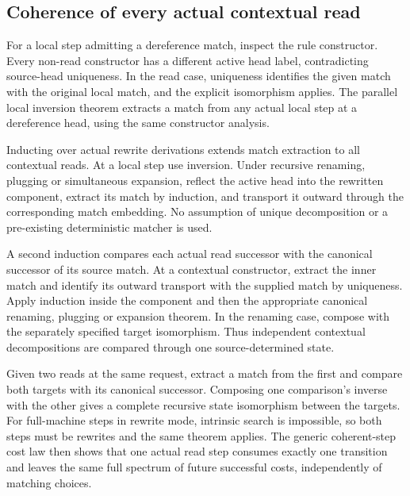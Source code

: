 

\subsection{Coherence of every actual contextual read}

For a local step admitting a dereference match, inspect the rule constructor.
Every non-read constructor has a different active head label, contradicting
source-head uniqueness. In the read case, uniqueness identifies the given
match with the original local match, and the explicit isomorphism applies.
The parallel local inversion theorem extracts a match from any actual local
step at a dereference head, using the same constructor analysis.



Inducting over actual rewrite derivations extends match extraction to all
contextual reads. At a local step use inversion. Under recursive renaming,
plugging or simultaneous expansion, reflect the active head into the rewritten
component, extract its match by induction, and transport it outward through
the corresponding match embedding. No assumption of unique decomposition
or a pre-existing deterministic matcher is used.


A second induction compares each actual read successor with the canonical
successor of its source match. At a contextual constructor, extract the inner
match and identify its outward transport with the supplied match by uniqueness.
Apply induction inside the component and then the appropriate canonical
renaming, plugging or expansion theorem. In the renaming case, compose with
the separately specified target isomorphism. Thus independent contextual
decompositions are compared through one source-determined state.


Given two reads at the same request, extract a match from the first and
compare both targets with its canonical successor. Composing one comparison's
inverse with the other gives a complete recursive state isomorphism between
the targets. For full-machine steps in rewrite mode, intrinsic search is
impossible, so both steps must be rewrites and the same theorem applies.
The generic coherent-step cost law then shows that one actual read step
consumes exactly one transition and leaves the same full spectrum of future
successful costs, independently of matching choices.


